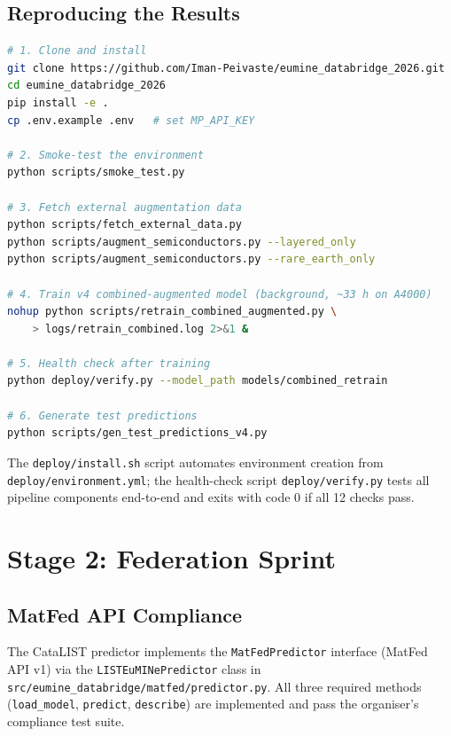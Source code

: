 \documentclass[10pt, a4paper]{article}
\begin{document}
\subsection{Reproducing the Results}

\begin{lstlisting}[language=bash, caption={Step-by-step reproduction commands.}]
# 1. Clone and install
git clone https://github.com/Iman-Peivaste/eumine_databridge_2026.git
cd eumine_databridge_2026
pip install -e .
cp .env.example .env   # set MP_API_KEY

# 2. Smoke-test the environment
python scripts/smoke_test.py

# 3. Fetch external augmentation data
python scripts/fetch_external_data.py
python scripts/augment_semiconductors.py --layered_only
python scripts/augment_semiconductors.py --rare_earth_only

# 4. Train v4 combined-augmented model (background, ~33 h on A4000)
nohup python scripts/retrain_combined_augmented.py \
    > logs/retrain_combined.log 2>&1 &

# 5. Health check after training
python deploy/verify.py --model_path models/combined_retrain

# 6. Generate test predictions
python scripts/gen_test_predictions_v4.py
\end{lstlisting}

The \texttt{deploy/install.sh} script automates environment creation
from \texttt{deploy/environment.yml}; the health-check script
\texttt{deploy/verify.py} tests all pipeline components end-to-end and
exits with code 0 if all 12 checks pass.

\section{Stage 2: Federation Sprint}

\subsection{MatFed API Compliance}

The CataLIST predictor implements the \texttt{MatFedPredictor} interface
(MatFed API v1) via the \texttt{LISTEuMINePredictor} class in
\texttt{src/eumine\_databridge/matfed/predictor.py}.
All three required methods (\texttt{load\_model}, \texttt{predict},
\texttt{describe}) are implemented and pass the organiser's compliance
test suite.
\end{document}
